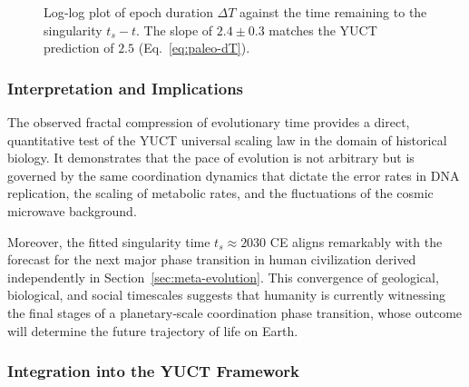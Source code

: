 \documentclass[12pt,a4paper]{article}
\theoremstyle{remark}
\begin{document}
	\begin{figure}[htbp]
		\centering
		\caption{Log‑log plot of epoch duration $\Delta T$ against the time remaining to the singularity $t_s - t$. The slope of $2.4 \pm 0.3$ matches the YUCT prediction of $2.5$ (Eq.~\ref{eq:paleo-dT}).}
		\label{fig:paleo-scaling}
	\end{figure}
	
	\subsubsection{Interpretation and Implications}
	
	The observed fractal compression of evolutionary time provides a direct, quantitative test of the YUCT universal scaling law in the domain of historical biology. It demonstrates that the pace of evolution is not arbitrary but is governed by the same coordination dynamics that dictate the error rates in DNA replication, the scaling of metabolic rates, and the fluctuations of the cosmic microwave background.
	
	Moreover, the fitted singularity time \(t_s \approx 2030\) CE aligns remarkably with the forecast for the next major phase transition in human civilization derived independently in Section~\ref{sec:meta-evolution}. This convergence of geological, biological, and social timescales suggests that humanity is currently witnessing the final stages of a planetary‑scale coordination phase transition, whose outcome will determine the future trajectory of life on Earth.
	
	\subsubsection{Integration into the YUCT Framework}
	
\end{document}
